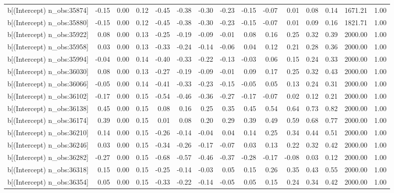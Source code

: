 \begin{table}[ht]
\begin{tabular}{rrrrrrrrrrrrrrr}
  b[(Intercept) n\_obs:35874] & -0.15 & 0.00 & 0.12 & -0.45 & -0.38 & -0.30 & -0.23 & -0.15 & -0.07 & 0.01 & 0.08 & 0.14 & 1671.21 & 1.00 \\ 
  b[(Intercept) n\_obs:35880] & -0.15 & 0.00 & 0.12 & -0.45 & -0.38 & -0.30 & -0.23 & -0.15 & -0.07 & 0.01 & 0.09 & 0.16 & 1821.71 & 1.00 \\ 
  b[(Intercept) n\_obs:35922] & 0.08 & 0.00 & 0.13 & -0.25 & -0.19 & -0.09 & -0.01 & 0.08 & 0.16 & 0.25 & 0.32 & 0.39 & 2000.00 & 1.00 \\ 
  b[(Intercept) n\_obs:35958] & 0.03 & 0.00 & 0.13 & -0.33 & -0.24 & -0.14 & -0.06 & 0.04 & 0.12 & 0.21 & 0.28 & 0.36 & 2000.00 & 1.00 \\ 
  b[(Intercept) n\_obs:35994] & -0.04 & 0.00 & 0.14 & -0.40 & -0.33 & -0.22 & -0.13 & -0.03 & 0.06 & 0.15 & 0.24 & 0.33 & 2000.00 & 1.00 \\ 
  b[(Intercept) n\_obs:36030] & 0.08 & 0.00 & 0.13 & -0.27 & -0.19 & -0.09 & -0.01 & 0.09 & 0.17 & 0.25 & 0.32 & 0.43 & 2000.00 & 1.00 \\ 
  b[(Intercept) n\_obs:36066] & -0.05 & 0.00 & 0.14 & -0.41 & -0.33 & -0.23 & -0.15 & -0.05 & 0.05 & 0.13 & 0.24 & 0.31 & 2000.00 & 1.00 \\ 
  b[(Intercept) n\_obs:36102] & -0.17 & 0.00 & 0.15 & -0.54 & -0.46 & -0.36 & -0.27 & -0.17 & -0.07 & 0.02 & 0.12 & 0.21 & 2000.00 & 1.00 \\ 
  b[(Intercept) n\_obs:36138] & 0.45 & 0.00 & 0.15 & 0.08 & 0.16 & 0.25 & 0.35 & 0.45 & 0.54 & 0.64 & 0.73 & 0.82 & 2000.00 & 1.00 \\ 
  b[(Intercept) n\_obs:36174] & 0.39 & 0.00 & 0.15 & 0.01 & 0.08 & 0.20 & 0.29 & 0.39 & 0.49 & 0.59 & 0.68 & 0.77 & 2000.00 & 1.00 \\ 
  b[(Intercept) n\_obs:36210] & 0.14 & 0.00 & 0.15 & -0.26 & -0.14 & -0.04 & 0.04 & 0.14 & 0.25 & 0.34 & 0.44 & 0.51 & 2000.00 & 1.00 \\ 
  b[(Intercept) n\_obs:36246] & 0.03 & 0.00 & 0.15 & -0.34 & -0.26 & -0.17 & -0.07 & 0.03 & 0.13 & 0.22 & 0.32 & 0.42 & 2000.00 & 1.00 \\ 
  b[(Intercept) n\_obs:36282] & -0.27 & 0.00 & 0.15 & -0.68 & -0.57 & -0.46 & -0.37 & -0.28 & -0.17 & -0.08 & 0.03 & 0.12 & 2000.00 & 1.00 \\ 
  b[(Intercept) n\_obs:36318] & 0.15 & 0.00 & 0.15 & -0.25 & -0.14 & -0.03 & 0.05 & 0.15 & 0.26 & 0.35 & 0.43 & 0.55 & 2000.00 & 1.00 \\ 
  b[(Intercept) n\_obs:36354] & 0.05 & 0.00 & 0.15 & -0.33 & -0.22 & -0.14 & -0.05 & 0.05 & 0.15 & 0.24 & 0.34 & 0.42 & 2000.00 & 1.00 \\ 

\end{tabular}
\end{table}
